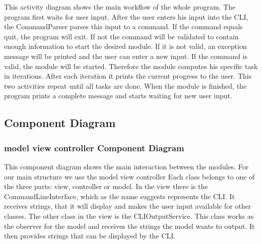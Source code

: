 \documentclass[parskip=full]{scrartcl}
\begin{document}
\begin{figure}[h]
\begin{center}

\label{User Input Activity Diagram}
\end{center}
\end{figure}
\newpage

This activity diagram shows the main workflow of the whole program.
The program first waits for user input.
After the user enters his input into the \gls{CLI}, the CommandParser parses this input to a command.
If the command equals quit, the program will exit.
If not the command will be validated to contain enough information to start the desired module.
If it is not valid, an exception message will be printed and the user can enter a new input.
If the command is valid, the module will be started.
Therefore the module computes his specific task in iterations.
After each iteration it prints the current progress to the user.
This two activities repeat until all tasks are done.
When the module is finished, the program prints a complete message and starts waiting for new user input.

\newpage

\subsection{Component Diagram}

\subsubsection{model view controller Component Diagram}

\begin{figure}[h]
\begin{center}

\label{model view controller Component Diagram}
\end{center}
\end{figure}
\newpage

This component diagram shows the main interaction between the modules.
For our main structure we use the model view controller
Each class belongs to one of the three parts: view, controller or model.
In the view there is the CommandLineInterface, which as the name suggests represents the \gls{CLI}.
It receives strings, that it will display and makes the user input available for other classes.
The other class in the view is the CLIOutputService.
This class works as the observer for the model and receives the strings the model wants to output.
It then provides strings that can be displayed by the \gls{CLI}.
\end{document}
